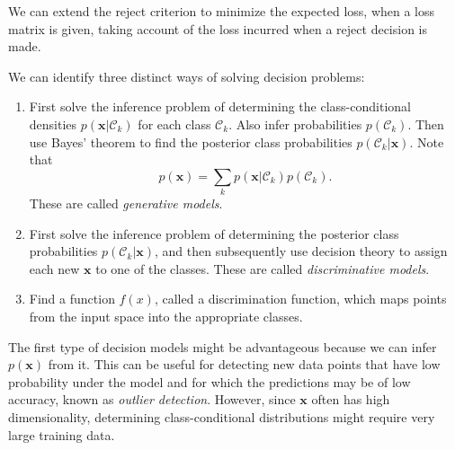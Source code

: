 \documentclass[11pt]{article}
\begin{document}
We can extend the reject criterion to minimize the expected loss, when a loss
matrix is given, taking account of the loss incurred when a reject decision is
made.

We can identify three distinct ways of solving decision problems:
\begin{enumerate}
\item First solve the inference problem of determining the class-conditional
  densities $p(\textbf{x}|\mathcal{C}_k)$ for each class $\mathcal{C}_k$. Also
  infer probabilities $p(\mathcal{C}_k)$. Then use Bayes' theorem to find the
  posterior class probabilities $p(\mathcal{C}_k | \textbf{x})$. Note that
  \begin{equation*}
    p(\textbf{x}) = \sum_k p(\textbf{x}|\mathcal{C}_k)p(\mathcal{C}_k).
  \end{equation*}
  These are called \textit{generative models}.
\item First solve the inference problem of determining the posterior class
  probabilities $p(\mathcal{C}_k|\textbf{x})$, and then subsequently use
  decision theory to assign each new $\textbf{x}$ to one of the classes.
  These are called \textit{discriminative models}.
\item Find a function $f(x)$, called a discrimination function, which maps
  points from the input space into the appropriate classes.
\end{enumerate}
The first type of decision models might be advantageous because we can infer
$p(\textbf{x})$ from it. This can be useful for detecting new data points that
have low probability under the model and for which the predictions may be of
low accuracy, known as \textit{outlier detection}. However, since $\textbf{x}$
often has high dimensionality, determining class-conditional distributions
might require very large training data.
\end{document}
